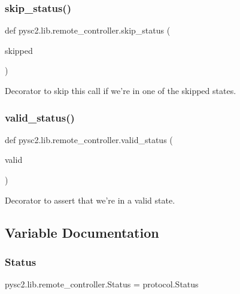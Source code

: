 \subsubsection{\texorpdfstring{skip\+\_\+status()}{skip\_status()}}
{\footnotesize\ttfamily def pysc2.\+lib.\+remote\+\_\+controller.\+skip\+\_\+status (\begin{DoxyParamCaption}\item[{}]{skipped }\end{DoxyParamCaption})}

\begin{DoxyVerb}Decorator to skip this call if we're in one of the skipped states.\end{DoxyVerb}
 \mbox{\label{namespacepysc2_1_1lib_1_1remote__controller_a8c5dd194ab269c652caa84cb3cf55188}} 
\subsubsection{\texorpdfstring{valid\+\_\+status()}{valid\_status()}}
{\footnotesize\ttfamily def pysc2.\+lib.\+remote\+\_\+controller.\+valid\+\_\+status (\begin{DoxyParamCaption}\item[{}]{valid }\end{DoxyParamCaption})}

\begin{DoxyVerb}Decorator to assert that we're in a valid state.\end{DoxyVerb}
 

\subsection{Variable Documentation}
\mbox{\label{namespacepysc2_1_1lib_1_1remote__controller_a5617a762b1212f364946016f69def53f}} 
\subsubsection{\texorpdfstring{Status}{Status}}
{\footnotesize\ttfamily pysc2.\+lib.\+remote\+\_\+controller.\+Status = protocol.\+Status}

